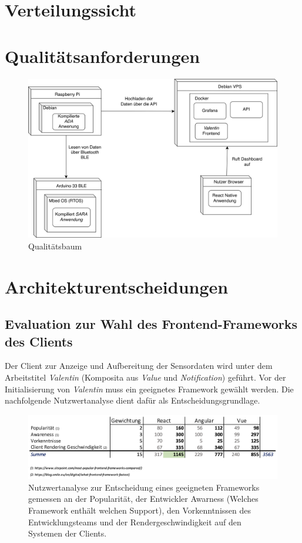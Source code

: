 \documentclass[
]{article}
\begin{document}
\newpage
\section{Verteilungssicht}
\section{Qualitätsanforderungen}
\begin{figure}[htbp]
	\centering
	\includegraphics[width=170mm]{resources/Verteilungssicht_Deployment.png}
	\caption{Qualitätsbaum}
	\label{fig:Qualitätsbaum}
\end{figure}  

\section{Architekturentscheidungen}
\subsection{Evaluation zur Wahl des Frontend-Frameworks des Clients}

Der Client zur Anzeige und Aufbereitung der Sensordaten wird unter dem Arbeitstitel \textit{Valentin} (Komposita aus \textit{Value} und \textit{Notification}) geführt. Vor der Initialisierung von \textit{Valentin} muss ein geeignetes Framework gewählt werden. Die nachfolgende Nutzwertanalyse dient dafür als Entscheidungsgrundlage. 

\begin{figure}
  \centering
  \includegraphics[width=1\textwidth]{./resources/techevaluationfe.png}
  \caption{Nutzwertanalyse zur Entscheidung eines geeigneten Frameworks gemessen an der Popularität, der Entwickler Awarness (Welches Framework enthält welchen Support), den Vorkenntnissen des Entwicklungsteams und der Rendergeschwindigkeit auf den Systemen der Clients.}
  \label{fig:deine_label}
\end{figure}
\end{document}
